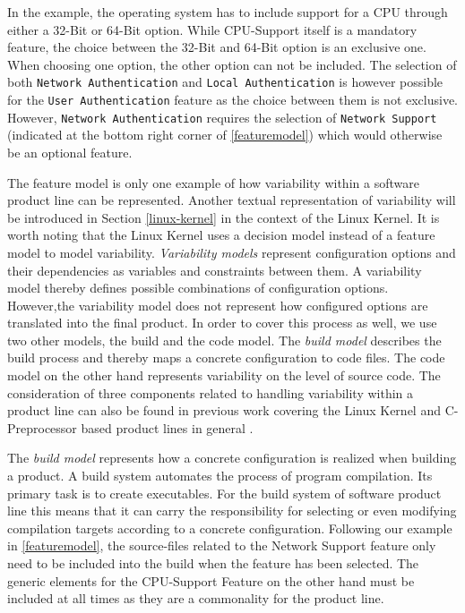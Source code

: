 \documentclass[a4paper]{article}
\begin{document}
In the example, the operating system has to include support for a CPU through either a 32-Bit or 64-Bit option. While CPU-Support itself is a mandatory feature, the choice between the 32-Bit and 64-Bit option is an exclusive one. When choosing one option, the other option can not be included. The selection of both \texttt{Network Authentication} and \texttt{Local Authentication} is however possible for the \texttt{User Authentication} feature as the choice between them is not exclusive. However, \texttt{Network Authentication} requires the selection of \texttt{Network Support} (indicated at the bottom right corner of \autoref{featuremodel}) which would otherwise be an optional feature. 

The feature model is only one example of how variability within a software product line can be represented. Another textual representation of variability will be introduced in Section \ref{linux-kernel} in the context of the Linux Kernel. It is worth noting that the Linux Kernel uses a decision model instead of a feature model to model variability. \emph{Variability models} represent configuration options and their dependencies as variables and constraints between them. A variability model thereby defines possible combinations of configuration options. However,the variability model does not represent how configured options are translated into the final product. In order to cover this process as well, we use two other models, the build and the code model. The \emph{build model} describes the build process and thereby maps a concrete configuration to code files. The code model on the other hand represents variability on the level of source code. The consideration of three components related to handling variability within a product line can also be found in previous work covering the Linux Kernel  \cite{nadi-linux-kernel} \cite{mining-kbuild} and C-Preprocessor based product lines in general \cite{KroeherEl-SharkawySchmid18}.

The \emph{build model} represents how a concrete configuration is realized when building a product. A build system automates the process of program compilation. Its primary task is to create executables. For the build system of software product line this means that it can carry the responsibility for selecting or even modifying compilation targets according to a concrete configuration. Following our example in \autoref{featuremodel}, the source-files related to the Network Support feature only need to be included into the build when the feature has been selected. The generic elements for the CPU-Support Feature on the other hand must be included at all times as they are a commonality for the product line. 
\end{document}

